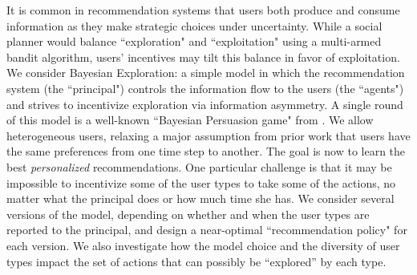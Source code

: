 It is common in recommendation systems that users both produce and consume information as they make strategic choices under uncertainty. While a social planner would balance ``exploration" and ``exploitation" using a multi-armed bandit algorithm, users’ incentives may tilt this balance in favor of exploitation. We consider Bayesian Exploration: a simple model in which the recommendation system (the ``principal") controls the information flow to the users (the ``agents") and strives to incentivize exploration via information asymmetry. A single round of this model is a well-known ``Bayesian Persuasion game" from \cite{Kamenica-aer11}. We allow heterogeneous users, relaxing a major assumption from prior work that users have the same preferences from one time step to another. The goal is now to learn the best \emph{personalized} recommendations. One particular challenge is that it may be impossible to incentivize some of the user types to take some of the actions, no matter what the principal does or how much time she has. We consider several versions of the model, depending on whether and when the user types are reported to the principal, and design a near-optimal ``recommendation policy" for each version. We also investigate how the model choice and the diversity of user types impact the set of actions that can possibly be “explored” by each type.
